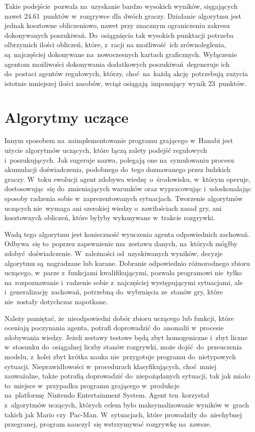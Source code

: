 \documentclass[declaration,shortabstract,inz]{iithesis}
\begin{document}
Takie podejście pozwala na~uzyskanie bardzo wysokich wyników, sięgających nawet 24.61~punktów w~rozgrywce dla dwóch graczy. Działanie algorytmu jest jednak kosztowne obliczeniowo, nawet przy znacznym ograniczeniu zakresu dokonywanych poszukiwań. Do~osiągnięcia tak wysokich punktacji potrzeba olbrzymich ilości obliczeń, które, z~racji na możliwość ich zrównoleglenia, są~najczęściej dokonywane na~nowoczesnych kartach graficznych. Wyłączenie agentom możliwości dokonywania dodatkowych poszukiwań degeneruje ich do~postaci agentów regułowych, którzy, choć na~każdą akcję potrzebują zużycia istotnie mniejszej ilości zasobów, wciąż osiągają imponujący wynik 23~punktów.

\section{Algorytmy uczące}

Innym sposobem na~zaimplementowanie programu grającego w~Hanabi jest użycie algorytmów uczących, które łączą zalety podejść regułowych i~poszukujących. Jak sugeruje nazwa, polegają one na~symulowaniu procesu akumulacji doświadczenia, podobnego do~tego doznawanego przez ludzkich graczy. W~toku ewolucji agent zdobywa wiedzę o~środowisku, w~którym operuje, dostosowując~się do~zmieniających warunków oraz wypracowując i~udoskonalając sposoby radzenia sobie w~zaprezentowanych sytuacjach. Tworzenie algorytmów uczących nie~wymaga ani szerokiej wiedzy o~zawiłościach zasad gry, ani kosztownych obliczeń, które byłyby wykonywane w~trakcie rozgrywki.

Wadą tego algorytmu jest konieczność wyuczenia agenta odpowiednich zachowań. Odbywa~się to~poprzez zapewnienie mu~zestawu danych, na~których mógłby zdobyć doświadczenie. W~zależności od~uzyskiwanych wyników, decyzje algorytmu są~nagradzane lub karane. Dobranie odpowiednio różnorodnego zbioru uczącego, w~parze z~funkcjami kwalifikującymi, pozwala programowi nie~tylko na~rozpoznawanie i~radzenie sobie z~najczęściej występującymi sytuacjami, ale i~generalizację zachowań, potrzebną do~wybrnięcia ze~stanów gry, które nie~zostały dotychczas napotkane.

Należy pamiętać, że~nieodpowiedni dobór zbioru uczącego lub funkcji, które oceniają poczynania agenta, potrafi doprowadzić do~anomalii w~procesie zdobywania wiedzy. Jeżeli zestawy testowe będą zbyt homogeniczne i~zbyt liczne w~stosunku do~osiągalnej liczby stanów rozgrywki, może dojść do~przeuczenia modelu, z~kolei zbyt krótka nauka nie~przygotuje programu do~nietypowych sytuacji. Nieprawidłowości w~procedurach klasyfikujących, choć mniej zauważalne, także potrafią doprowadzić do~niepożądanych sytuacji, tak jak miało to~miejsce w~przypadku programu grającego w~produkcje na~platformę Nintendo Entertainment System. Agent ten~korzystał z~algorytmów uczących, których celem było maksymalizowanie wyników w~grach takich jak Mario czy~Pac-Man. W~sytuacjach, które prowadziły do~niechybnej przegranej, program nauczył~się wstrzymywać rozgrywkę na~zawsze\cite{Mario}.
\end{document}
